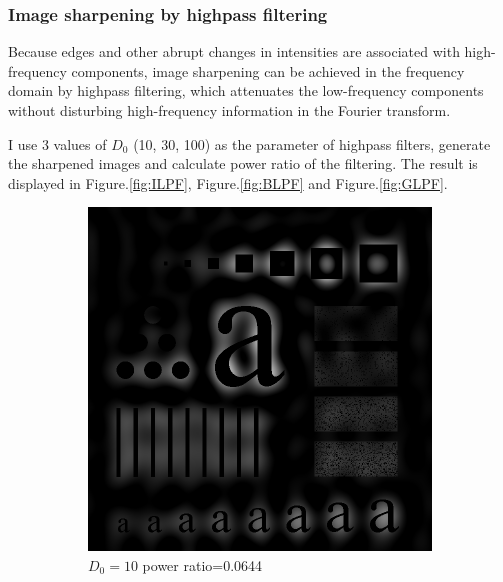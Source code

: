 \subsubsection{Image sharpening by highpass filtering}
Because edges and other abrupt changes in intensities are associated with high-frequency components, image sharpening can be achieved in the frequency domain by highpass filtering, which attenuates the low-frequency components without disturbing high-frequency information in the Fourier transform.

I use 3 values of $D_0$ (10, 30, 100) as the parameter of highpass filters, generate the sharpened images and calculate power ratio of the filtering. The result is displayed in Figure.\ref{fig:ILPF}, Figure.\ref{fig:BLPF} and Figure.\ref{fig:GLPF}.

\begin{figure}[h!]
	\centering
	\begin{subfigure}[b]{0.3\linewidth}
		\includegraphics[width=\linewidth]{myfigure/p3/IHPF_10.png}
		\caption{$D_0=10$ power ratio=0.0644}
		\label{fig:IHPF_10}
	\end{subfigure}
  	\begin{subfigure}[b]{0.3\linewidth}

\end{subfigure}
\end{figure}
